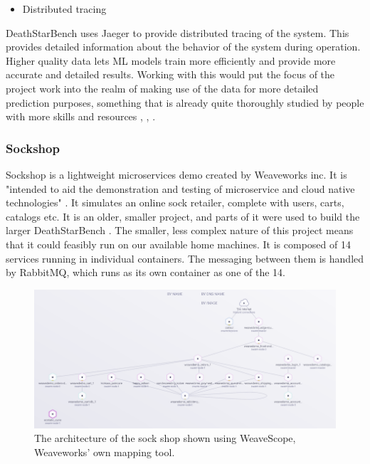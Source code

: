 \begin{itemize}
    \item Distributed tracing
\end{itemize}
DeathStarBench uses Jaeger to provide distributed tracing of the system. This provides detailed information about the behavior of the system during operation. Higher quality data lets ML models train more efficiently and provide more accurate and detailed results. 
Working with this would put the focus of the project work into the realm of making use of the data for more detailed prediction purposes, something that is already quite thoroughly studied by people with more skills and resources \cite*{Bogatinovski}, \cite*{Nedelkoski2019}, \cite*{Zhou2021a}.



\subsubsection{Sockshop}
Sockshop is a lightweight microservices demo created by Weaveworks inc. It is "intended to aid the demonstration and testing of microservice and cloud native technologies" \cite*{Weaveworks}. It simulates an online sock retailer, complete with users, carts, catalogs etc. 
It is an older, smaller project, and parts of it were used to build the larger DeathStarBench \cite*{Gan2019}.
The smaller, less complex nature of this project means that it could feasibly run on our available home machines. 
It is composed of 14 services running in individual containers. The messaging between them is handled by RabbitMQ, which runs as its own container as one of the 14. 

\begin{figure}[ht] 
\centering 
\includegraphics[width=\columnwidth]{Figures/Charts/sockshop-scope_trimmed.png}
\caption{The architecture of the sock shop shown using WeaveScope, Weaveworks' own mapping tool. \cite*{Weaveworks}}
\label{Sockshop architecture}
\end{figure}

